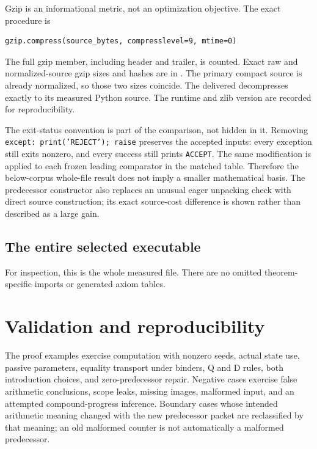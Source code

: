 Gzip is an informational metric, not an optimization objective. The exact
procedure is
\begin{lstlisting}
gzip.compress(source_bytes, compresslevel=9, mtime=0)
\end{lstlisting}
The full gzip member, including header and trailer, is counted. Exact raw
and normalized-source gzip sizes and hashes are in
. The primary compact source is already
normalized, so those two sizes coincide. The delivered 
decompresses exactly to its measured Python source. The runtime and zlib
version are recorded for reproducibility.

The exit-status convention is part of the comparison, not hidden in it.
Removing \texttt{except: print('REJECT'); raise} preserves the accepted
inputs: every exception still exits nonzero, and every success still
prints \texttt{ACCEPT}. The same modification is applied to each frozen
leading comparator in the matched table. Therefore the below-corpus
whole-file result does not imply a smaller mathematical basis. The
predecessor constructor also replaces an unusual eager unpacking check
with direct source construction; its exact source-cost difference is
shown rather than described as a large gain.

\subsection{The entire selected executable}

For inspection, this is the whole measured file. There are no omitted
theorem-specific imports or generated axiom tables.


\section{Validation and reproducibility}



The proof examples exercise computation with nonzero seeds, actual state
use, passive parameters, equality transport under binders, Q and D rules,
both introduction choices, and zero-predecessor repair. Negative cases
exercise false arithmetic conclusions, scope leaks, missing images,
malformed input, and an attempted compound-progress inference.
Boundary cases whose intended arithmetic meaning changed with the new
predecessor packet are reclassified by that meaning; an old malformed
counter is not automatically a malformed predecessor.

